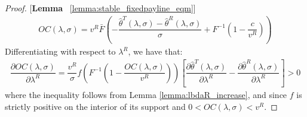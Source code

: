 \begin{proof}{[\textbf{Lemma} ~\ref{lemma:stable_fixedpayline_eqm}]}
\begin{align*}
  OC(\lambda,\sigma) = v^R\bar{F}\left(-\dfrac{\hat{\theta}^T(\lambda,\sigma)-\hat{\theta}^R(\lambda,\sigma)}{\sigma} + F^{-1}\left(1-\dfrac{c}{v^R}\right)\right)
\end{align*}
Differentiating with respect to $\lambda^R$, we have that:
\begin{align*}
  \dfrac{\partial OC(\lambda,\sigma)}{\partial \lambda^R} = \dfrac{v^R}{\sigma}f\left(F^{-1}\left(1-\dfrac{OC(\lambda,\sigma)}{v^R}\right)\right)\left[\dfrac{\partial \hat{\theta}^T(\lambda,\sigma)}{\partial \lambda^R} - \dfrac{\partial \hat{\theta}^R(\lambda,\sigma)}{\partial \lambda^R}\right] > 0
\end{align*}
where the inequality follows from Lemma \ref{lemma:lbdaR_increase}, and since $f$ is strictly positive on the interior of its support and $0<OC(\lambda,\sigma)<v^R$.
\end{proof}

